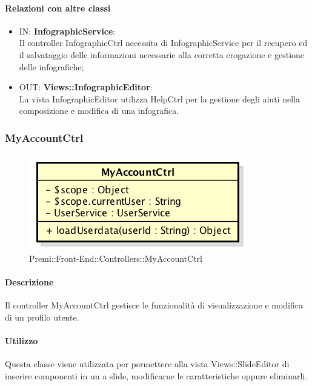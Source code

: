 	\paragraph{Relazioni con altre classi}
	\begin{itemize}
		\item IN: \textbf{InfographicService}:\\
			Il controller InfographicCtrl necessita di InfographicService per il recupero ed il salvataggio delle informazioni necessarie alla corretta erogazione e gestione delle infografiche;
		\item OUT: \textbf{Views::InfographicEditor}:\\
			La vista InfographicEditor utilizza HelpCtrl per la gestione degli aiuti nella composizione e modifica di una infografica.
	\end{itemize}
\newpage


\subsubsection{MyAccountCtrl}
\begin{figure}[h]
	\centering
	\includegraphics[width=0.4\linewidth]{img/premi_front_end_controllers_myaccountctrl}
	\caption[Premi::Front-End::Controllers::MyAccountCtrl]{Premi::Front-End::Controllers::MyAccountCtrl}
\end{figure}
\paragraph{Descrizione}
Il controller MyAccountCtrl gestisce le funzionalità di visualizzazione e modifica di un profilo utente.

\paragraph{Utilizzo}
Questa classe viene utilizzata per permettere alla vista Views::SlideEditor di inserire componenti in un a slide, modificarne le caratteristiche oppure eliminarli.\\
